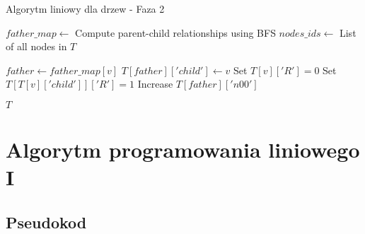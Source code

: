     \begin{algorithm}
    \caption*{Algorytm liniowy dla drzew - Faza 2}
    \begin{algorithmic}[1]
            \State $father\_map \gets$ Compute parent-child relationships using BFS
            \State $nodes\_ids \gets$ List of all nodes in $T$
    
                \State $father \gets father\_map[v]$
                    \State $T[father]['child'] \gets v$
                        \State Set $T[v]['R'] = 0$
                        \State Set $T[T[v]['child']]['R'] = 1$
                        \State Increase $T[father]['n00']$
                    \EndIf
                \EndIf
            \EndFor
    
            \State \Return $T$
        \EndFunction
    \end{algorithmic}
\end{algorithm}

\section{Algorytm programowania liniowego I}
\subsection{Pseudokod}

